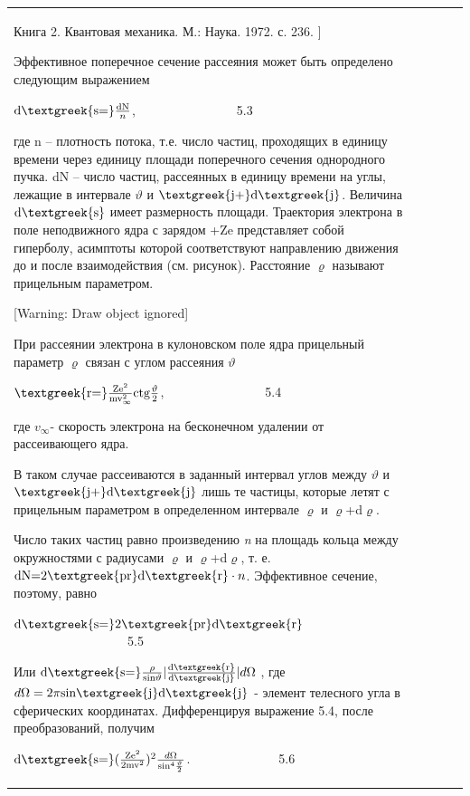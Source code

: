 \documentclass[a4paper,14pt, openany, twoside, draft]{extbook} %
\begin{document}
\begin{flushleft}
\begin{supertabular}{|m{1.7279999cm}|m{1.522cm}|m{1.522cm}|m{1.522cm}|m{1.744cm}|}
 Книга 2. Квантовая механика. М.: Наука. 1972. с. 236. ]

Эффективное поперечное сечение рассеяния может быть определено следующим выражением

 ${\text{d\textgreek{s=}}}\frac{{\text{dN}}} n$,\ \ \ \ \ \ \ \ \ \ \ \ \ \ \ \ 5.3

где n – плотность потока, т.е. число частиц, проходящих в единицу времени через единицу площади поперечного сечения однородного пучка. dN – число частиц, рассеянных в единицу времени на углы, лежащие в интервале  $\vartheta $ и  ${\text{\textgreek{j+}d\textgreek{j}}}$. Величина  ${\text{d\textgreek{s}}}$ имеет размерность площади. Траектория электрона в поле неподвижного ядра с зарядом +Ze представляет собой гиперболу, асимптоты которой соответствуют направлению движения до и после взаимодействия (см. рисунок). Расстояние ${\varrho}$ называют прицельным параметром.

[Warning: Draw object ignored]

При рассеянии электрона в кулоновском поле ядра прицельный параметр ${\varrho}$ связан с углом рассеяния ${\vartheta}$

 ${\text{\textgreek{r=}}}\frac{{\text{Ze}}^2}{{\text{mv}}_{\infty }^2}{\text{ctg}}\frac{\vartheta } 2$,\ \ \ \ \ \ \ \ \ \ \ \ \ \ \ \ 5.4

где  $v_{\infty }${}- скорость электрона на бесконечном удалении от рассеивающего ядра.

В таком случае рассеиваются в заданный интервал углов между  $\vartheta $ и  ${\text{\textgreek{j+}d\textgreek{j}}}$ лишь те частицы, которые летят с прицельным параметром в определенном интервале ${\varrho}$ и ${\varrho}$+d${\varrho}$.

Число таких частиц равно произведению \emph{n} на площадь кольца между окружностями с радиусами ${\varrho}$ и ${\varrho}$+d${\varrho}$, т. е.  ${\text{dN=}}2{\text{\textgreek{pr}d\textgreek{r}}}\cdot n$. Эффективное сечение, поэтому, равно

 ${\text{d\textgreek{s=}}}2{\text{\textgreek{pr}d\textgreek{r}}}$ \ \ \ \ \ \ \ \ \ \ \ \ \ \ \ \ \ \ 5.5

Или  ${\text{d\textgreek{s=}}}\frac{\rho }{\text{sin}\vartheta }|\frac{{\text{d\textgreek{r}}}}{{\text{d\textgreek{j}}}}|d\Omega $ , где  $d\Omega =2\pi \text{sin}{\text{\textgreek{j}d\textgreek{j}}}$ - элемент телесного угла в сферических координатах. Дифференцируя выражение 5.4, после преобразований, получим

  ${\text{d\textgreek{s=}}}(\frac{{\text{Ze}}^2}{2{\text{mv}}^2})^2\frac{d\Omega }{\text{sin}^4\frac{\vartheta } 2}$.\ \ \ \ \ \ \ \ \ \ \ \ \ \ 5.6


\end{supertabular}
\end{flushleft}
\end{document}
